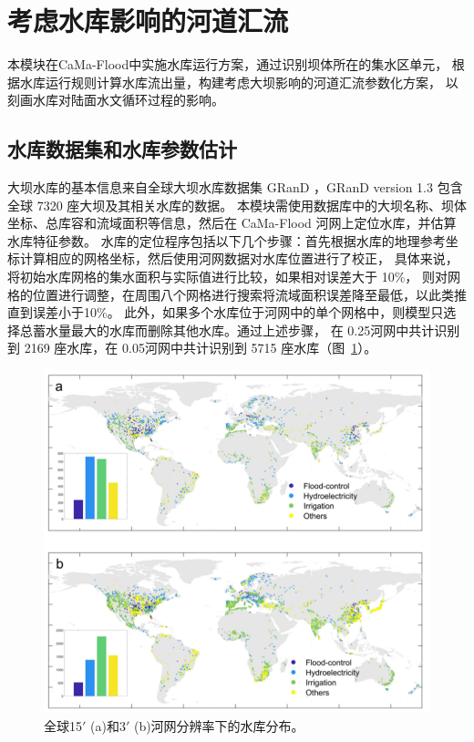 \section{考虑水库影响的河道汇流}
    本模块在CaMa-Flood中实施水库运行方案，通过识别坝体所在的集水区单元，
    根据水库运行规则计算水库流出量，构建考虑大坝影响的河道汇流参数化方案，
    以刻画水库对陆面水文循环过程的影响。
    
\subsection{水库数据集和水库参数估计}\label{水库数据集和水库参数估计}
大坝水库的基本信息来自全球大坝水库数据集 GRanD \citep{lehner2011high}，GRanD version 1.3 包含全球 7320 座大坝及其相关水库的数据。
本模块需使用数据库中的大坝名称、坝体坐标、总库容和流域面积等信息，然后在 CaMa-Flood 河网上定位水库，并估算水库特征参数。
水库的定位程序包括以下几个步骤：首先根据水库的地理参考坐标计算相应的网格坐标，然后使用河网数据对水库位置进行了校正，
具体来说，将初始水库网格的集水面积与实际值进行比较，如果相对误差大于 10\%，
则对网格的位置进行调整，在周围八个网格进行搜索将流域面积误差降至最低，以此类推直到误差小于10\%。
此外，如果多个水库位于河网中的单个网格中，则模型只选择总蓄水量最大的水库而删除其他水库。通过上述步骤，
在 0.25\textdegree 河网中共计识别到 2169 座水库，在 0.05\textdegree 河网中共计识别到 5715 座水库（图~\ref{fig:水库分布}）。

{
\begin{figure}[]
\centering
\includegraphics{Figures/陆地表面的水分循环/水库分布.png}
\caption{全球15$'$ (a)和3$'$ (b)河网分辨率下的水库分布。}
\label{fig:水库分布}
\end{figure}
}

